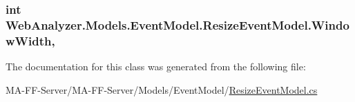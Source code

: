 \subsubsection[{Window\+Width}]{\setlength{\rightskip}{0pt plus 5cm}int Web\+Analyzer.\+Models.\+Event\+Model.\+Resize\+Event\+Model.\+Window\+Width\hspace{0.3cm}{\ttfamily [get]}, {\ttfamily [set]}}\label{class_web_analyzer_1_1_models_1_1_event_model_1_1_resize_event_model_a4af3fc44a8ef02d431323fc2bce6c2e6}


The documentation for this class was generated from the following file\+:\begin{DoxyCompactItemize}
\item 
M\+A-\/\+F\+F-\/\+Server/\+M\+A-\/\+F\+F-\/\+Server/\+Models/\+Event\+Model/\hyperlink{_resize_event_model_8cs}{Resize\+Event\+Model.\+cs}\end{DoxyCompactItemize}

